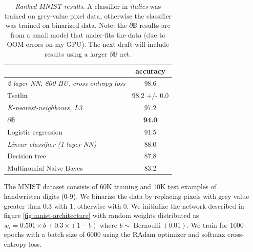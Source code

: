 \documentclass{article}
\theoremstyle{plain}
\theoremstyle{definition}
\theoremstyle{remark}
\begin{document}
\begin{table}[t]
	\centering
	\begin{tabular}{lc}
		\cline{2-2}
		& \textbf{accuracy}                  \\ \hline
		\multicolumn{1}{|l|}{\em 2-layer NN, 800 HU, cross-entropy loss} & \multicolumn{1}{c|}{98.6} \\ \hline
		\multicolumn{1}{|l|}{Tsetlin}                        & \multicolumn{1}{c|}{98.2 +/- 0.0}  \\ \hline
		\multicolumn{1}{|l|}{\em K-nearest-neighbours, L3}       & \multicolumn{1}{c|}{97.2}          \\ \hline
		\multicolumn{1}{|l|}{$\partial\mathbb{B}$}           & \multicolumn{1}{c|}{\textbf{94.0}} \\ \hline
		\multicolumn{1}{|l|}{Logistic regression}            & \multicolumn{1}{c|}{91.5}          \\ \hline
		\multicolumn{1}{|l|}{\em Linear classifier (1-layer NN)} & \multicolumn{1}{c|}{88.0}          \\ \hline
		\multicolumn{1}{|l|}{Decision tree}                  & \multicolumn{1}{c|}{87.8}          \\ \hline
		\multicolumn{1}{|l|}{Multinomial Naive Bayes}        & \multicolumn{1}{c|}{83.2}          \\ \hline
	\end{tabular}
	\caption{{\em Ranked MNIST results}. A classifier in {\em italics} was trained on grey-value pixel data, otherwise the classifier was trained on binarized data. Note: the $\partial\mathbb{B}$ results are from a small model that under-fits the data (due to OOM errors on my GPU). The next draft will include results using a larger $\partial\mathbb{B}$ net.}
	\label{tab:mnist-table}
\end{table}

The MNIST dataset \cite{726791} consists of 60K training and 10K test examples of handwritten digits (0-9). We binarize the data by replacing pixels with grey value greater than 0.3 with 1, otherwise with 0. We initialize the network described in figure \ref{fig:mnist-architecture} with random weights distributed as $w_{i} = 0.501 \times b + 0.3 \times (1-b)$ where $b \sim \operatorname{Bernoulli}(0.01)$. We train for 1000 epochs with a batch size of 6000 using the RAdam optimizer and softmax cross-entropy loss.
\end{document}

